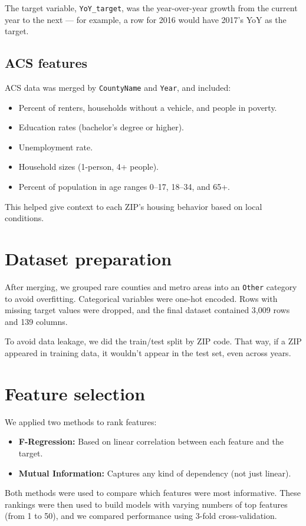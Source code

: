 The target variable, \texttt{YoY\_target}, was the year-over-year growth from the current year to the next — for example, a row for 2016 would have 2017's YoY as the target.

\subsection{ACS features}
ACS data was merged by \texttt{CountyName} and \texttt{Year}, and included:
\begin{itemize}
    \item Percent of renters, households without a vehicle, and people in poverty.
    \item Education rates (bachelor’s degree or higher).
    \item Unemployment rate.
    \item Household sizes (1-person, 4+ people).
    \item Percent of population in age ranges 0--17, 18--34, and 65+.
\end{itemize}

This helped give context to each ZIP’s housing behavior based on local conditions.

\section{Dataset preparation}
After merging, we grouped rare counties and metro areas into an \texttt{Other} category to avoid overfitting. Categorical variables were one-hot encoded. Rows with missing target values were dropped, and the final dataset contained 3{,}009 rows and 139 columns.

To avoid data leakage, we did the train/test split by ZIP code. That way, if a ZIP appeared in training data, it wouldn’t appear in the test set, even across years.

\section{Feature selection}
We applied two methods to rank features:
\begin{itemize}
    \item \textbf{F-Regression:} Based on linear correlation between each feature and the target.
    \item \textbf{Mutual Information:} Captures any kind of dependency (not just linear).
\end{itemize}

Both methods were used to compare which features were most informative. These rankings were then used to build models with varying numbers of top features (from 1 to 50), and we compared performance using 3-fold cross-validation.

